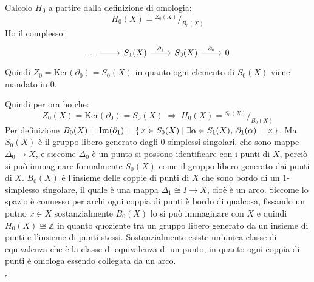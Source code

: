 \documentclass[10pt, twoside=false, x11names]{scrbook}
\newenvironment{proof}{{\textbf{Dimostrazione}:}}{\hfill $\square$}
\newcommand{\Z}{\mathbb{Z}}
\newcommand{\im}[1]{\mathrm{Im}( #1 )}
\renewcommand{\ker}[1]{\mathrm{Ker}( #1)}
\newcommand*\quot[2]{{^{\textstyle #1}\big/_{\textstyle #2}}}
\begin{document}
\begin{proof}
  Calcolo $ H_0 $ a partire dalla definizione di omologia:
  \[
    H_0(X) = \quot{Z_0(X)}{B_0(X)}
  \]
  Ho il complesso:
  \[
    \begin{tikzcd}
      \dots \arrow{r}{} & S_1(X) \arrow{r}{\partial_1} & S_0(X) \arrow{r}{\partial_0}  & 0
    \end{tikzcd}
  \]
  Quindi $ Z_0 = \ker{\partial_0} = S_0(X) $ in quanto ogni elemento di $ S_0(X) $ viene
  mandato in $ 0 $.

  Quindi per ora ho che:
  \[
    Z_0(X) = \ker{\partial_0} = S_0(X) \; \Rightarrow \; H_0(X) = \quot{S_0(X)}{B_0(X)}
  \]
  Per definizione $ B_0(X) = \im{\partial_1} = \set{ x \in S_0(X) | \exists \alpha \in S_1(X), \; \partial_1(\alpha) = x} $. %
  Ma $ S_0(X) $ è il gruppo libero generato dagli $ 0 $-simplessi singolari,
  che sono mappe $ \Delta_0 \to X $, e siccome $ \Delta_0 $ è un punto si possono identificare
  con i punti di $ X $, perciò si può immaginare formalmente $ S_0(X) $ come il gruppo libero
  generato dai punti di $ X $. $ B_0(X) $ è l'insieme delle coppie di punti di $ X $ che sono
  bordo di un $ 1 $-simplesso singolare, il quale è una mappa $ \Delta_1 \cong I \to X $, cioè è un
  arco. Siccome lo spazio è connesso per archi ogni coppia di punti è bordo di qualcosa, fissando
  un putno $ x \in X $ sostanzialmente $ B_0(X) $ lo si può immaginare con $ X $ e quindi
  $ H_0(X) \cong \Z $ in quanto quoziente tra un gruppo libero generato da un insieme di punti
  e l'insieme di punti stessi. Sostanzialmente esiste un'unica classe di equivalenza che
  è la classe di equivalenza di un punto, in quanto ogni coppia di punti è omologa essendo
  collegata da un arco.


\end{proof}
\hfill\newline\newline
\end{document}
